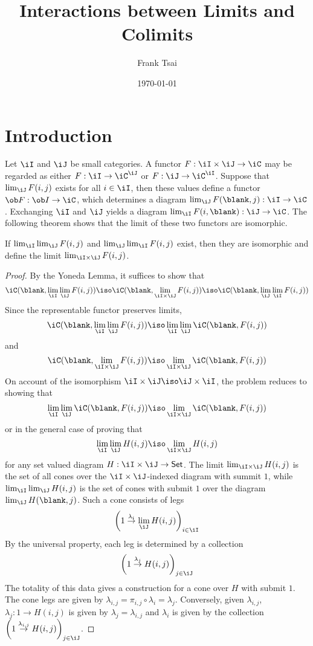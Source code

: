 \documentclass{amsart}
\title{Interactions between Limits and Colimits}
\author{Frank Tsai}
\date{\today}
\begin{document}
\maketitle
\tableofcontents

\section{Introduction}
\label{sec:introduction}

Let $\iI$ and $\iJ$ be small categories.
A functor $F : \iI \times \iJ \to \iC$ may be regarded as either $F : \iI \to \iC^{\iJ}$ or $F : \iJ \to \iC^{\iI}$.
Suppose that $\lim_{\iJ}F(i,j)$ exists for all $i \in \iI$, then these values define a functor $\ob F : \ob I \to \iC$, which determines a diagram $\lim_{\iJ} F(\blank, j) : \iI \to \iC$.
Exchanging $\iI$ and $\iJ$ yields a diagram $\lim_{\iI} F(i, \blank) : \iJ \to \iC$.
The following theorem shows that the limit of these two functors are isomorphic.

\begin{thm}
  If $\lim_{\iI}\lim_{\iJ}F(i,j)$ and $\lim_{\iJ}\lim_{\iI}F(i,j)$ exist, then they are isomorphic and define the limit $\lim_{\iI \times \iJ}F(i,j)$.
\end{thm}
\begin{proof}
  By the Yoneda Lemma, it suffices to show that
  \[
    \iC(\blank, \lim_{\iI}\lim_{\iJ}F(i,j)) \iso \iC(\blank, \lim_{\iI \times \iJ}F(i,j)) \iso \iC(\blank, \lim_{\iJ}\lim_{\iI}F(i,j))
  \]
  Since the representable functor preserves limits,
  \[
    \iC(\blank, \lim_{\iI}\lim_{\iJ}F(i,j)) \iso \lim_{\iI}\lim_{\iJ}\iC(\blank, F(i,j))
  \]
  and
  \[
    \iC(\blank, \lim_{\iI \times \iJ}F(i,j)) \iso \lim_{\iI \times \iJ}\iC(\blank, F(i,j))
  \]
  On account of the isomorphism $\iI \times \iJ \iso \iJ \times \iI$, the problem reduces to showing that
  \[
    \lim_{\iI}\lim_{\iJ}\iC(\blank, F(i,j)) \iso \lim_{\iI \times \iJ}\iC(\blank, F(i,j))
  \]
  or in the general case of proving that
  \[
    \lim_{\iI}\lim_{\iJ}H(i,j) \iso \lim_{\iI \times \iJ}H(i,j)
  \]
  for any set valued diagram $H : \iI \times \iJ \to \mathsf{Set}$.
  The limit $\lim_{\iI \times \iJ}H(i,j)$ is the set of all cones over the $\iI \times \iJ$-indexed diagram with summit $1$, while $\lim_{\iI}\lim_{\iJ}H(i,j)$ is the set of cones with submit $1$ over the diagram $\lim_{\iJ}H(\blank,j)$.
  Such a cone consists of legs
  \[
    \left( 1 \overset{\lambda_{i}}{\to} \lim_{\iJ}H(i,j) \right)_{i \in \iI}
  \]
  By the universal property, each leg is determined by a collection
  \[
    \left( 1 \overset{\lambda_{j}}{\to} H(i,j) \right)_{j \in \iJ}
  \]
  The totality of this data gives a construction for a cone over $H$ with submit $1$.
  The cone legs are given by $\lambda_{i,j} = \pi_{i,j} \circ \lambda_{i} = \lambda_{j}$.
  Conversely, given $\lambda_{i,j}$, $\lambda_{j} : 1 \to H(i,j)$ is given by $\lambda_{j} = \lambda_{i,j}$ and $\lambda_{i}$ is given by the collection $\left( 1 \overset{\lambda_{i,j}}{\to} H(i,j) \right)_{j\in\iJ}$.
\end{proof}
\end{document}
